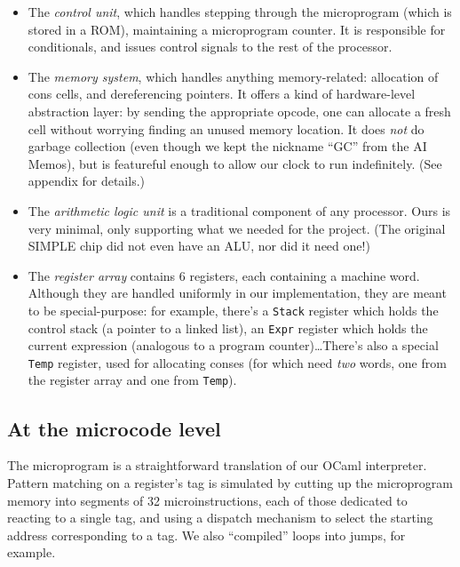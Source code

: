 \documentclass[a4paper, 11pt]{article}
\begin{document}
\begin{itemize}
\item The \emph{control unit}, which handles stepping through the microprogram (which is stored in a ROM), maintaining a microprogram counter. It is responsible for conditionals, and issues control signals to the rest of the processor. 
\item The \emph{memory system}, which handles anything memory-related: allocation of cons cells, and dereferencing pointers. It offers a kind of hardware-level abstraction layer: by sending the appropriate opcode, one can allocate a fresh cell without worrying finding an unused memory location. It does \emph{not} do garbage collection (even though we kept the nickname \enquote{GC} from the AI Memos), but is featureful enough to allow our clock to run indefinitely. (See appendix for details.)
\item The \emph{arithmetic logic unit} is a traditional component of any processor. Ours is very minimal, only supporting what we needed for the project. (The original SIMPLE chip \cite{SIMPLE} did not even have an ALU, nor did it need one!)
\item The \emph{register array} contains 6 registers, each containing a machine word. Although they are handled uniformly in our implementation, they are meant to be special-purpose: for example, there's a \texttt{Stack} register which holds the control stack (a pointer to a linked list), an \texttt{Expr} register which holds the current expression (analogous to a program counter)\dots There's also a special \texttt{Temp} register, used for allocating conses (for which need \emph{two} words, one from the register array and one from \texttt{Temp}).
\end{itemize}

\subsection{At the microcode level}

The microprogram is a straightforward translation of our OCaml interpreter. Pattern matching on a register's tag is simulated by cutting up the microprogram memory into segments of 32 microinstructions, each of those dedicated to reacting to a single tag, and using a dispatch mechanism to select the starting address corresponding to a tag. We also \enquote{compiled} loops into jumps, for example.
\end{document}
